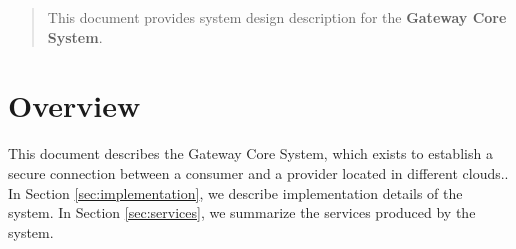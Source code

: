 \documentclass[a4paper]{arrowhead}
\begin{document}
\ArrowheadDate{\today}
\ArrowheadSetup

\begin{center}
  \vspace*{1cm}
  \huge{\arrowtitle}

  \vspace*{0.2cm}
  \LARGE{\arrowtype}
  \vspace*{1cm}

  \vspace*{\fill}


  \vspace*{1cm}
  \vspace*{\fill}

  \begin{abstract}
    This document provides system design description for the \textbf{Gateway Core System}.
  \end{abstract}

  \vspace*{1cm}

 \end{center}

\newpage

\tableofcontents
\newpage

\section{Overview}
\label{sec:overview}
\color{black}
This document describes the Gateway Core System, which exists to establish a secure connection between a
consumer and a provider located in different clouds.. In Section \ref{sec:implementation}, we describe implementation details of the system. In Section \ref{sec:services}, we summarize the services produced by the system.
\end{document}
